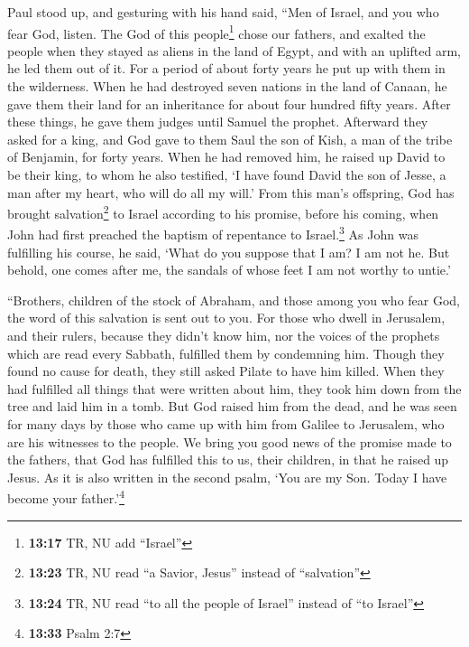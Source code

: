  Paul stood up, and gesturing with his hand said, ``Men
of Israel, and you who fear God, listen.  The God of this
people\footnote{\textbf{13:17} TR, NU add ``Israel''} chose our fathers,
and exalted the people when they stayed as aliens in the land of Egypt,
and with an uplifted arm, he led them out of it.  For a
period of about forty years he put up with them in the wilderness.
 When he had destroyed seven nations in the land of
Canaan, he gave them their land for an inheritance for about four
hundred fifty years.  After these things, he gave them
judges until Samuel the prophet.  Afterward they asked
for a king, and God gave to them Saul the son of Kish, a man of the
tribe of Benjamin, for forty years.  When he had removed
him, he raised up David to be their king, to whom he also testified, `I
have found David the son of Jesse, a man after my heart, who will do all
my will.'  From this man's offspring, God has brought
salvation\footnote{\textbf{13:23} TR, NU read ``a Savior, Jesus''
  instead of ``salvation''} to Israel according to his promise,
 before his coming, when John had first preached the
baptism of repentance to Israel.\footnote{\textbf{13:24} TR, NU read
  ``to all the people of Israel'' instead of ``to Israel''}
 As John was fulfilling his course, he said, `What do you
suppose that I am? I am not he. But behold, one comes after me, the
sandals of whose feet I am not worthy to untie.'

 ``Brothers, children of the stock of Abraham, and those
among you who fear God, the word of this salvation is sent out to you.
 For those who dwell in Jerusalem, and their rulers,
because they didn't know him, nor the voices of the prophets which are
read every Sabbath, fulfilled them by condemning him. 
Though they found no cause for death, they still asked Pilate to have
him killed.  When they had fulfilled all things that were
written about him, they took him down from the tree and laid him in a
tomb.  But God raised him from the dead, 
and he was seen for many days by those who came up with him from Galilee
to Jerusalem, who are his witnesses to the people.  We
bring you good news of the promise made to the fathers, 
that God has fulfilled this to us, their children, in that he raised up
Jesus. As it is also written in the second psalm, `You are my Son. Today
I have become your father.'\footnote{\textbf{13:33} Psalm 2:7}


